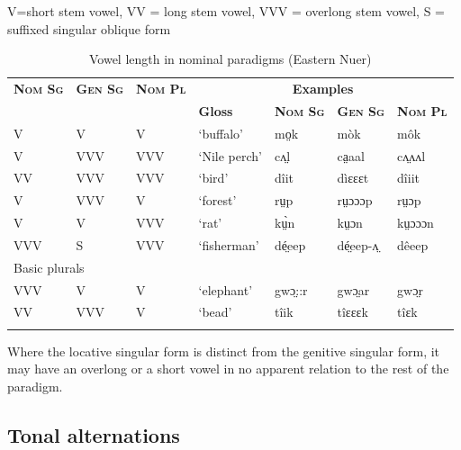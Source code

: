\documentclass[output=paper
,newtxmath
,modfonts
,nonflat]{langsci/langscibook}
\begin{document}
\begin{table}
V=short stem vowel, VV = long stem vowel, VVV = overlong stem vowel, S = suffixed singular oblique form
\begin{tabularx}{\textwidth}{lllXlll}
\lsptoprule

\bfseries\scshape Nom Sg & \bfseries\scshape Gen Sg & \bfseries\scshape Nom Pl & \multicolumn{4}{c}{\bfseries Examples}\\
\cmidrule{4-7}
&  &  & \bfseries Gloss & \bfseries\scshape Nom Sg & \bfseries\scshape Gen Sg & \bfseries\scshape Nom Pl\\
\midrule
V & V & V & ‘buffalo’ & mo̤k & mòk & môk\\
V & VVV & VVV & ‘Nile perch’ & cʌ̤l & ca̤aal & cʌ̤ʌʌl\\
VV & VVV & VVV & ‘bird’ & dîit & dìɛɛɛt & dîiit\\
V & VVV & V & ‘forest’ & rṳp & rṳɔɔɔp & rṳɔp\\
V & V & VVV & ‘rat’ & kṳ̀n & kṳɔn & kṳɔɔɔn\\
VVV & S & VVV & ‘fisherman’ & dé̤eep & dé̤eep-ʌ̤ & dêeep\\
\midrule
\multicolumn{7}{l}{Basic plurals}\\
\midrule
VVV & V & V & ‘elephant’ & gwɔ̤::r & gwɔ̤ar & gwɔ̤r\\
VV & VVV & V & ‘bead’ & tîik & tîɛɛɛk & tîɛk\\
\lspbottomrule
\end{tabularx}
\caption{Vowel length in nominal paradigms (Eastern Nuer)}
\label{tab:monich:20}
\end{table}
Where the locative singular form is distinct from the genitive singular form, it may have an overlong or a short vowel in no apparent relation to the rest of the paradigm.

\subsection{Tonal alternations}
\end{document}
